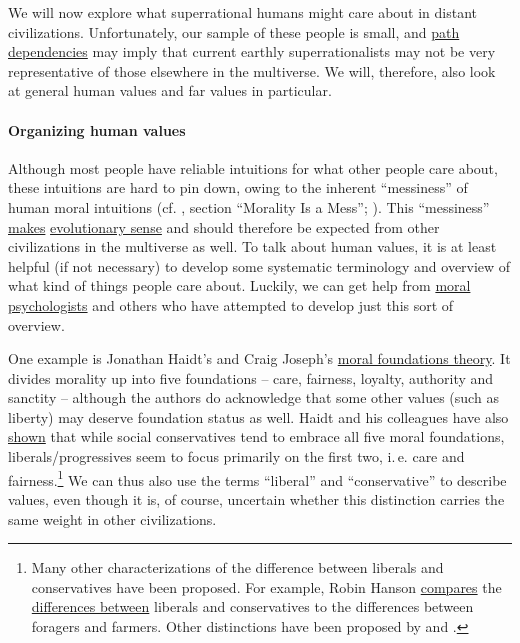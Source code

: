 We will now explore what superrational humans might care about in
distant civilizations. Unfortunately, our sample of these people is
small, and
\href{https://en.wikipedia.org/wiki/Path_dependence}{path
dependencies} may imply that current earthly superrationalists may not
be very representative of those elsewhere in the multiverse. We will,
therefore, also look at general human values and far values in
particular.

\hypertarget{organizing-human-values}{\paragraph{Organizing human
values}\label{organizing-human-values}}

Although most people have reliable intuitions for what other people care
about, these intuitions are hard to pin down, owing to the inherent
``messiness'' of human moral intuitions (cf.
\citet{Stewart-Williams2015-gg}, section ``Morality Is a
Mess''; \cite[chapters 3--5.3]{Muehlhauser2012-ib}). This ``messiness''
\href{http://lesswrong.com/lw/l3/thou_art_godshatter/}{makes}
\href{https://en.wikipedia.org/wiki/Modularity_of_mind\#Evolutionary_psychology_and_massive_modularity}{evolutionary
sense} \parencite{cosmides1994origins}
 and should therefore be expected from other
civilizations in the multiverse as well. To talk about human values, it
is at least helpful (if not necessary) to develop some systematic
terminology and overview of what kind of things people care about.
Luckily, we can get help from
\href{https://en.wikipedia.org/wiki/Moral_psychology}{moral
psychologists} and others who have attempted to develop just this sort
of overview.

One example is Jonathan Haidt's and Craig Joseph's
\href{https://en.wikipedia.org/wiki/Moral_foundations_theory}{moral
foundations theory}. It divides morality up into five foundations --
care, fairness, loyalty, authority and sanctity -- although the authors
do acknowledge that some other values (such as liberty) may deserve
foundation status as well. Haidt and his colleagues have also
\href{https://en.wikipedia.org/wiki/Moral_foundations_theory\#Political_ideology}{shown}
that while social conservatives tend to embrace all five moral
foundations, liberals/progressives seem to focus primarily on the first
two, i.\,e. care and fairness.\footnote{Many other characterizations of
  the difference between liberals and conservatives have been proposed.
  For example, Robin Hanson
  \href{http://www.overcomingbias.com/2012/05/forager-vs-farmer-morality.html}{compares}
  the
  \href{http://www.overcomingbias.com/2010/10/two-types-of-people.html}{differences
  between} liberals and conservatives to the differences between
  foragers and farmers. Other distinctions have been proposed by \citet{sinn2016replacing}
  and \citet{lakoff1997moral}.} We can thus also use the terms ``liberal'' and
``conservative'' to describe values, even though it is, of course,
uncertain whether this distinction carries the same weight in other
civilizations.

